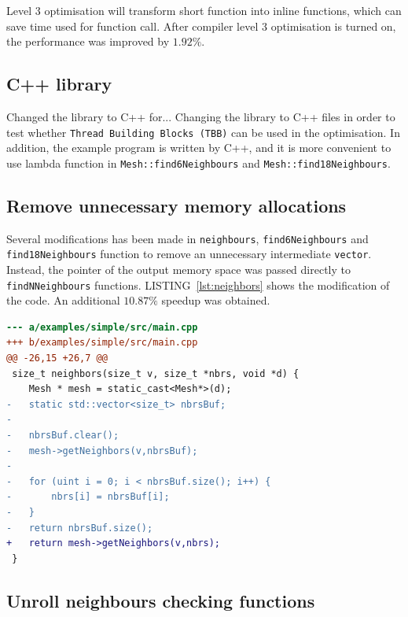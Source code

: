 \documentclass[conference]{IEEEtran}
\newcommand{\lref}[1]{LISTING~\ref{#1}}
\begin{document}
Level 3 optimisation will transform short function into inline functions, which can save time used for function call. After compiler level 3 optimisation is turned on, the performance was improved by $1.92\%$.

\subsection{C++ library}

Changed the library to C++ for...
Changing the library to C++ files in order to test whether \texttt{Thread Building Blocks (TBB)} can be used in the optimisation. In addition, the example program is written by C++, and it is more convenient to use lambda function in \texttt{Mesh::find6Neighbours} and \texttt{Mesh::find18Neighbours}. 

\subsection{Remove unnecessary memory allocations}

Several modifications has been made in \texttt{neighbours}, \texttt{find6Neighbours} and \texttt{find18Neighbours} function to remove an unnecessary intermediate \texttt{vector}. Instead, the pointer of the output memory space was passed directly to \texttt{findNNeighbours} functions. \lref{lst:neighbors} shows the modification of the code. An additional $10.87\%$ speedup was obtained.

\begin{lstlisting}[language=diff,label=lst:neighbors]
--- a/examples/simple/src/main.cpp
+++ b/examples/simple/src/main.cpp
@@ -26,15 +26,7 @@
 size_t neighbors(size_t v, size_t *nbrs, void *d) {
    Mesh * mesh = static_cast<Mesh*>(d);
-   static std::vector<size_t> nbrsBuf;
-
-   nbrsBuf.clear();
-   mesh->getNeighbors(v,nbrsBuf);
-
-   for (uint i = 0; i < nbrsBuf.size(); i++) {
-       nbrs[i] = nbrsBuf[i];
-   }
-   return nbrsBuf.size();
+   return mesh->getNeighbors(v,nbrs);
 }
\end{lstlisting}

\subsection{Unroll neighbours checking functions}
\end{document}

